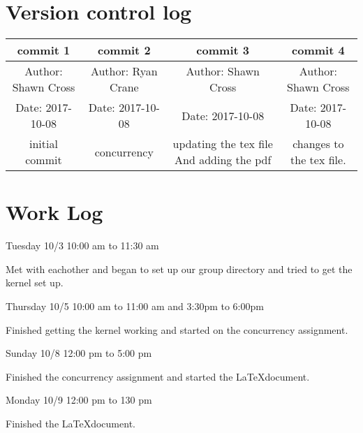 \documentclass[letterpaper,10pt,titlepage]{article}
\begin{document}
\section{Version control log}
\begin{center}
   \begin{tabular}{ |c|c|c|c|}
      \hline
      commit 1&commit 2&commit 3&commit 4\\ 
      \hline
      Author: Shawn Cross &Author: Ryan Crane &Author: Shawn Cross &Author: Shawn Cross \\
      \hline
      Date:   2017-10-08&Date:   2017-10-08&Date:   2017-10-08&Date:   2017-10-08\\
      \hline
      initial commit&concurrency&updating the tex file And adding the pdf&changes to the tex file.\\
      \hline
   \end{tabular}
\end{center}

\section{Work Log}
Tuesday 10/3 10:00 am to 11:30 am

Met with eachother and began to set up our group directory and tried to get the kernel
set up. 

Thursday 10/5 10:00 am to 11:00 am and 3:30pm to 6:00pm

Finished getting the kernel working and started on the concurrency assignment.

Sunday 10/8 12:00 pm to 5:00 pm 

Finished the concurrency assignment and started the \LaTeX document.

Monday 10/9 12:00 pm to 130 pm 

Finished the \LaTeX document.
%
\end{document}

